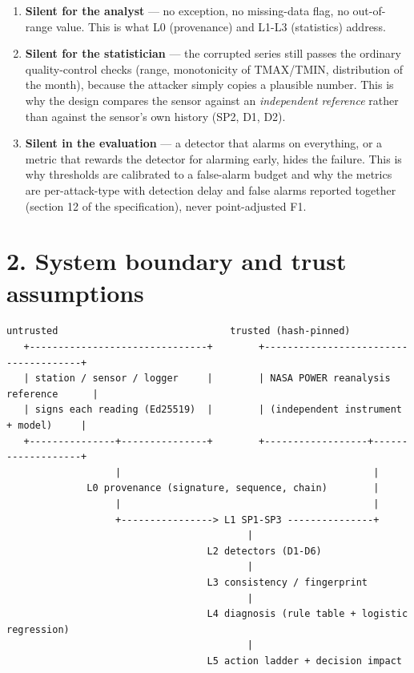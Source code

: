 \documentclass[10pt,a4paper]{article}
\begin{document}
\begin{enumerate}
\item \textbf{Silent for the analyst} — no exception, no missing-\allowbreak{}data flag, no
out-\allowbreak{}of-\allowbreak{}range value. This is what L0 (provenance) and L1-\allowbreak{}L3 (statistics) address.

\item \textbf{Silent for the statistician} — the corrupted series still passes the
ordinary quality-\allowbreak{}control checks (range, monotonicity of TMAX/\allowbreak{}TMIN, distribution of the month), because the attacker simply copies a plausible number. This is why the design compares the sensor against an \emph{independent reference} rather than against the sensor's own history (SP2, D1, D2).

\item \textbf{Silent in the evaluation} — a detector that alarms on everything, or a
metric that rewards the detector for alarming early, hides the failure. This is why thresholds are calibrated to a false-\allowbreak{}alarm budget and why the metrics are per-\allowbreak{}attack-\allowbreak{}type with detection delay and false alarms reported together (section 12 of the specification), never point-\allowbreak{}adjusted F1.

\end{enumerate}

\section*{2. System boundary and trust assumptions}
\begin{Verbatim}[breaklines=true,breakanywhere=true,fontsize=\footnotesize,frame=none,numbers=none]
                 untrusted                              trusted (hash-pinned)
   +-------------------------------+        +--------------------------------------+
   | station / sensor / logger     |        | NASA POWER reanalysis reference      |
   | signs each reading (Ed25519)  |        | (independent instrument + model)     |
   +---------------+---------------+        +------------------+-------------------+
                   |                                            |
              L0 provenance (signature, sequence, chain)        |
                   |                                            |
                   +----------------> L1 SP1-SP3 ---------------+
                                          |
                                   L2 detectors (D1-D6)
                                          |
                                   L3 consistency / fingerprint
                                          |
                                   L4 diagnosis (rule table + logistic regression)
                                          |
                                   L5 action ladder + decision impact
\end{Verbatim}
\end{document}
